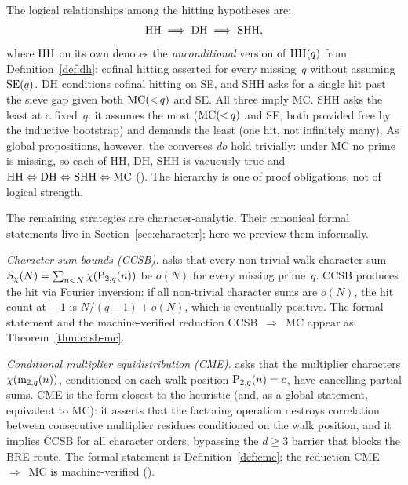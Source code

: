 \begin{remark}\label{rem:shh-vs-dh}
The logical relationships among the hitting hypotheses are:
\[
  \mathrm{HH} \;\Longrightarrow\; \mathrm{DH} \;\Longrightarrow\; \mathrm{SHH},
\]
where $\mathrm{HH}$ on its own denotes the \emph{unconditional} version of
$\mathrm{HH}(q)$ from Definition~\ref{def:dh}: cofinal hitting asserted for
every missing~$q$ without assuming $\mathrm{SE}(q)$.
DH conditions cofinal hitting on SE, and SHH asks for a
single hit past the sieve gap given both $\mathrm{MC}({<}\,q)$ and SE\@.
All three imply MC\@.  SHH asks the least at a fixed~$q$: it assumes the
most ($\mathrm{MC}({<}\,q)$ and SE, both provided free by the inductive
bootstrap) and demands the least (one hit, not infinitely many).  As
global propositions, however, the converses \emph{do} hold trivially:
under MC no prime is missing, so each of HH, DH, SHH is vacuously true
and $\mathrm{HH} \Leftrightarrow \mathrm{DH} \Leftrightarrow \mathrm{SHH}
\Leftrightarrow \mathrm{MC}$
().  The
hierarchy is one of proof obligations, not of logical strength.
\end{remark}

The remaining strategies are character-analytic.  Their canonical
formal statements live in Section~\ref{sec:character}; here we
preview them informally.

\smallskip\noindent\emph{Character sum bounds (CCSB).}\enspace
{} asks that every non-trivial walk
character sum $S_\chi(N) = \sum_{n<N}\chi(\mathrm{P}_{2,q}(n))$ be
$o(N)$ for every missing prime~$q$.  CCSB produces the hit via
Fourier inversion: if all non-trivial character sums are $o(N)$, the
hit count at~$-1$ is $N/(q{-}1) + o(N)$, which is eventually
positive.  The formal statement and the machine-verified reduction
CCSB~$\Rightarrow$~MC appear as Theorem~\ref{thm:ccsb-mc}.

\smallskip\noindent\emph{Conditional multiplier equidistribution
(CME).}\enspace
{} asks that the multiplier
characters $\chi(\mathrm{m}_{2,q}(n))$, conditioned on each walk position
$\mathrm{P}_{2,q}(n) = c$, have cancelling partial sums.  CME is the
form closest to the heuristic (and, as a global statement, equivalent to
MC): it asserts that the factoring operation destroys
correlation between consecutive multiplier residues conditioned on
the walk position, and it implies CCSB for all character orders,
bypassing the $d \geq 3$ barrier that blocks the BRE route.  The
formal statement is Definition~\ref{def:cme}; the reduction
CME~$\Rightarrow$~MC is machine-verified
().

